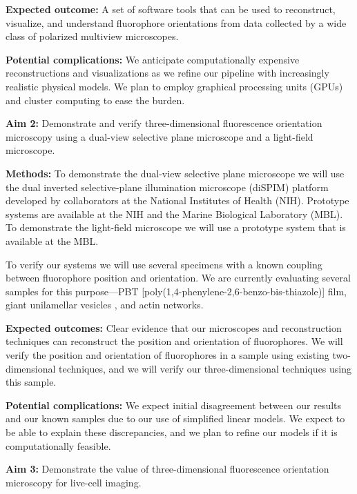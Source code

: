 \documentclass[11pt]{article}
\begin{document}
\noindent\textbf{Expected outcome:} A set of software tools that can be used
to reconstruct, visualize, and understand fluorophore orientations from data
collected by a wide class of polarized multiview microscopes.

\noindent\textbf{Potential complications:} We anticipate computationally
expensive reconstructions and visualizations as we refine our pipeline with
increasingly realistic physical models. We plan to employ graphical processing
units (GPUs) and cluster computing to ease the burden.

\noindent\textbf{Aim 2:} Demonstrate and verify three-dimensional fluorescence
orientation microscopy using a dual-view selective plane microscope and a
light-field microscope.

\noindent\textbf{Methods:} To demonstrate the dual-view selective plane
microscope we will use the dual inverted selective-plane illumination
microscope (diSPIM) platform developed by collaborators at the National
Institutes of Health (NIH). Prototype systems are available at the NIH and the
Marine Biological Laboratory (MBL). To demonstrate the light-field microscope we
will use a prototype system that is available at the MBL.

To verify our systems we will use several specimens with a known coupling
between fluorophore position and orientation. We are currently evaluating
several samples for this purpose---PBT
[poly(1,4-phenylene-2,6-benzo-bis-thiazole)] film, giant unilamellar vesicles
\cite{schmid}, and actin networks.

\noindent\textbf{Expected outcomes:} Clear evidence that our microscopes and
reconstruction techniques can reconstruct the position and orientation of
fluorophores. We will verify the position and orientation of fluorophores in a
sample using existing two-dimensional techniques, and we will verify our
three-dimensional techniques using this sample.

\noindent\textbf{Potential complications:} We expect initial disagreement
between our results and our known samples due to our use of simplified linear
models. We expect to be able to explain these discrepancies, and we plan to
refine our models if it is computationally feasible.

\noindent\textbf{Aim 3:} Demonstrate the value of three-dimensional fluorescence
  orientation microscopy for live-cell imaging.
\end{document}
